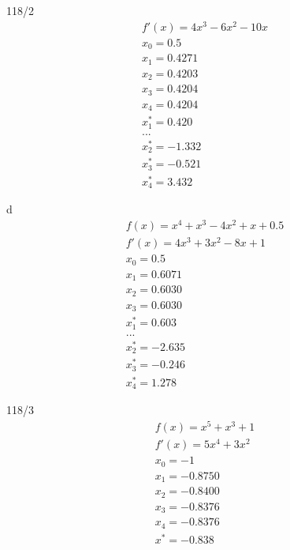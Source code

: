 \begin{exercise}{118/2}
\begin{gather*}
    f'(x) = 4x^3 - 6x^2 - 10x \\
    x_0 = 0.5 \\
    x_1 = 0.4271 \\
    x_2 = 0.4203 \\
    x_3 = 0.4204 \\
    x_4 = 0.4204 \\
    x_1^\ast = 0.420 \\
    ... \\
    x_2^\ast = -1.332 \\
    x_3^\ast = -0.521 \\
    x_4^\ast = 3.432
  \end{gather*}
  \item [d]
  \begin{gather*}
    f(x) = x^4 + x^3 - 4x^2 + x + 0.5 \\
    f'(x) = 4x^3 + 3x^2 - 8x + 1 \\
    x_0 = 0.5 \\
    x_1 = 0.6071 \\
    x_2 = 0.6030 \\
    x_3 = 0.6030 \\
    x_1^\ast = 0.603 \\
    ... \\
    x_2^\ast = -2.635 \\
    x_3^\ast = -0.246 \\
    x_4^\ast = 1.278
  \end{gather*}
\end{exercise}
\begin{exercise}{118/3}
  \begin{gather*}
    f(x) = x^5 + x^3 + 1 \\
    f'(x) = 5x^4 + 3x^2 \\
    x_0 = -1 \\
    x_1 = -0.8750 \\
    x_2 = -0.8400 \\
    x_3 = -0.8376 \\
    x_4 = -0.8376 \\
    x^\ast = -0.838
  \end{gather*}
\end{exercise}

